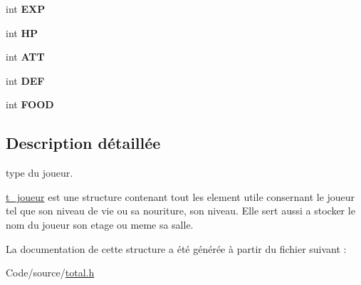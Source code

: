 \begin{DoxyCompactItemize}
\item 
int {\bfseries E\+XP}\hypertarget{structt__joueur_ad1e277dbbb6e308a4ed6047b051cd184}{}\label{structt__joueur_ad1e277dbbb6e308a4ed6047b051cd184}

\item 
int {\bfseries HP}\hypertarget{structt__joueur_a152d91e6a9d741b2914f06997c0044f9}{}\label{structt__joueur_a152d91e6a9d741b2914f06997c0044f9}

\item 
int {\bfseries A\+TT}\hypertarget{structt__joueur_ac4f5b3473792a52bac1d64a3f4f2b7e9}{}\label{structt__joueur_ac4f5b3473792a52bac1d64a3f4f2b7e9}

\item 
int {\bfseries D\+EF}\hypertarget{structt__joueur_a14432729537b37583c49fb38896d8f99}{}\label{structt__joueur_a14432729537b37583c49fb38896d8f99}

\item 
int {\bfseries F\+O\+OD}\hypertarget{structt__joueur_ac2643fd79fbfc94efaa7ae6d989b3ca3}{}\label{structt__joueur_ac2643fd79fbfc94efaa7ae6d989b3ca3}

\end{DoxyCompactItemize}


\subsection{Description détaillée}
type du joueur. 

\hyperlink{structt__joueur}{t\+\_\+joueur} est une structure contenant tout les element utile consernant le joueur tel que son niveau de vie ou sa nouriture, son niveau. Elle sert aussi a stocker le nom du joueur son etage ou meme sa salle. 

La documentation de cette structure a été générée à partir du fichier suivant \+:\begin{DoxyCompactItemize}
\item 
Code/source/\hyperlink{total_8h}{total.\+h}\end{DoxyCompactItemize}
